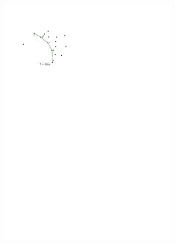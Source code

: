 \begin{figure}
\begin{subfigure}[b]{0.3\linewidth}
    \caption{}
  \end{subfigure}%
  \qquad 
  \begin{subfigure}[b]{0.3\linewidth}
    \centering
    \includegraphics[page=2,width=\textwidth]{figs/movingarm.pdf}
    \caption{}
  \end{subfigure}
  \qquad 
  \begin{subfigure}[b]{0.3\linewidth}
    \centering

\end{subfigure}
\end{figure}
